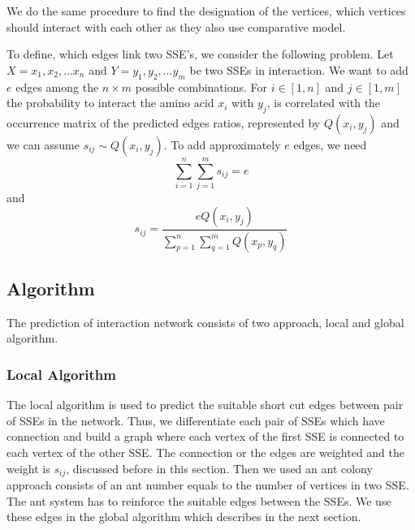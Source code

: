 We do the same procedure to find the designation of the vertices, which vertices should interact with each other as they also use comparative model.

To define, which edges link two SSE's, we consider the following problem.
Let $ X = x_1, x_2, \ldots x_n$ and $Y = y_1, y_2, \ldots y_m$ be two SSEs in interaction. We want to add $e$ edges among the $n\times m$ possible combinations. For $i \in [1, n]$ and $j \in [1, m]$ the probability to interact the amino acid $x_i$ with $y_j$, is correlated with the occurrence matrix of the predicted edges ratios, represented by $Q(x_i, y_j)$ and we can assume $s_{ij} \sim Q(x_i, y_j)$. To add approximately $e$ edges, we need
\begin{equation}
\sum_{i=1}^n \sum_{j=1}^m s_{ij} = e 
\end{equation}
and
\begin{equation}
s_{ij} = \frac{e Q(x_i, y_j)} {\sum\nolimits_{p=1}^n \sum\nolimits_{q=1}^m Q(x_p, y_q)}
\end{equation}
\subsection {Algorithm}
The prediction of interaction network consists of two approach, local and global algorithm.
\subsubsection {Local Algorithm}
The local algorithm is used to predict the suitable short cut edges between pair of SSEs in the network. Thus, we differentiate each pair of SSEs which have connection and build a graph where each vertex of the first SSE is connected to each vertex of the other SSE. The connection or the edges are weighted and the weight is $s_{ij}$, discussed before in this section. Then we used an ant colony approach consists of an ant number equals to the number of vertices in two SSE. The ant system has to reinforce the suitable edges between the SSEs. We use these edges in the global algorithm which describes in the next section.

